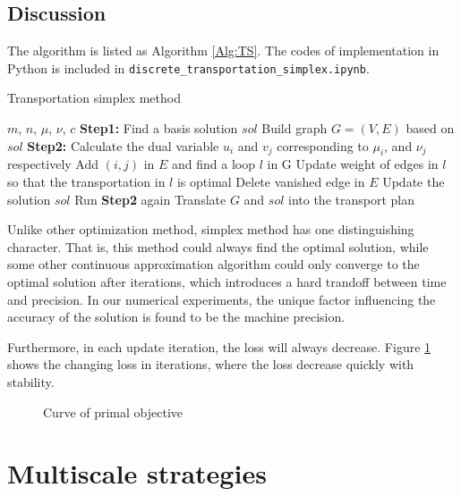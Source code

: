 \documentclass[english]{pkupaper}
\begin{document}
\subsection{Discussion}

The algorithm is listed as Algorithm \ref{Alg:TS}. The codes of implementation in Python is included in \verb"discrete_transportation_simplex.ipynb".

\begin{algorithm}
	\caption{Transportation simplex method} \label{Alg:TS}
	\begin{algorithmic}
		\REQUIRE $m$, $n$, $\mu$, $\nu$, $c$
		\STATE \textbf{Step1:} 
		\STATE Find a basis solution $\mathit{sol}$
		\STATE Build graph $G = (V, E)$ based on $\mathit{sol}$
		\STATE \textbf{Step2:} 
		\STATE Calculate the dual variable $u_i$ and $v_j$ corresponding to $\mu_i$, and $\nu_j$ respectively
			\STATE Add $(i, j)$ in $E$ and find a loop $l$ in G
			\STATE Update weight of edges in $l$ so that the transportation in $l$ is optimal
			\STATE Delete vanished edge in $E$
			\STATE Update the solution $\mathit{sol}$
			\STATE Run \textbf{Step2} again
		\ENDIF
		\STATE Translate $G$ and $\mathit{sol}$ into the transport plan
	\end{algorithmic}
\end{algorithm}

Unlike other optimization method, simplex method has one distinguishing character. That is, this method could always find the optimal solution, while some other continuous approximation algorithm could only converge to the optimal solution after iterations, which introduces a hard trandoff between time and precision. In our numerical experiments, the unique factor influencing the accuracy of the solution is found to be the machine precision.

Furthermore, in each update iteration, the loss will always decrease. Figure \ref{Fig:CPO} shows the changing loss in iterations, where the loss decrease quickly with stability.

\begin{figure}
\centering
\scalebox{0.65}{}
\caption{Curve of primal objective} \label{Fig:CPO}
\end{figure}

\section{Multiscale strategies} \label{Sec:MS}
\end{document}
